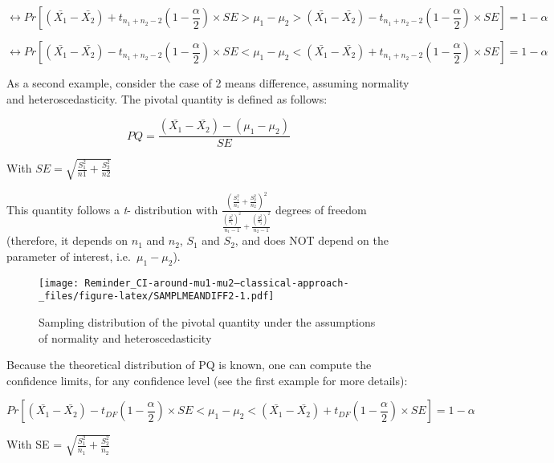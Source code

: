 \documentclass[
  man,floatsintext]{apa6}
\begin{document}
\begin{equation} 
\leftrightarrow Pr[(\bar{X_1}-\bar{X_2}) +t_{n_1+n_2-2}(1-\frac{\alpha}{2}) \times SE > \mu_1-\mu_2 > (\bar{X_1}-\bar{X_2}) - t_{n_1+n_2-2}(1-\frac{\alpha}{2}) \times SE]= 1- \alpha
\label{eq:conflev5}
\end{equation}

\begin{equation} 
\leftrightarrow Pr[(\bar{X_1}-\bar{X_2}) - t_{n_1+n_2-2}(1-\frac{\alpha}{2}) \times SE < \mu_1-\mu_2 <(\bar{X_1}-\bar{X_2}) +t_{n_1+n_2-2}(1-\frac{\alpha}{2}) \times SE]= 1- \alpha
\label{eq:conflev6}
\end{equation}

As a second example, consider the case of 2 means difference, assuming normality and heteroscedasticity. The pivotal quantity is defined as follows:

\begin{equation} 
PQ= \frac{(\bar{X_1}-\bar{X_2})-(\mu_1-\mu_2)}{SE}
\label{eq:PQwelch}
\end{equation}

With \(SE = \sqrt{\frac{S^2_1}{n1}+\frac{S^2_2}{n2}}\)

This quantity follows a \emph{t}- distribution with \(\frac{(\frac{S^2_1}{n_1}+\frac{S^2_2}{n_2})^2}{\frac{(\frac{S^2_1}{n_1})^2}{n_1-1}+\frac{(\frac{S^2_2}{n_2})^2}{n_2-1}}\) degrees of freedom (therefore, it depends on \(n_1\) and \(n_2\), \(S_1\) and \(S_2\), and does NOT depend on the parameter of interest, i.e.~\(\mu_1-\mu_2\)).

\begin{figure}
\centering
\texttt{[image: Reminder\_CI-around-mu1-mu2--classical-approach-\_files/figure-latex/SAMPLMEANDIFF2-1.pdf]}
\caption{\label{fig:SAMPLMEANDIFF2}Sampling distribution of the pivotal quantity under the assumptions of normality and heteroscedasticity}
\end{figure}

Because the theoretical distribution of PQ is known, one can compute the confidence limits, for any confidence level (see the first example for more details):

\begin{equation} 
Pr[(\bar{X_1}-\bar{X_2}) - t_{DF}(1-\frac{\alpha}{2}) \times SE < \mu_1-\mu_2 <(\bar{X_1}-\bar{X_2}) +t_{DF}(1-\frac{\alpha}{2}) \times SE]= 1- \alpha
\label{eq:conflev6}
\end{equation}

With SE = \(\sqrt{\frac{S_1^2}{n_1}+\frac{S_2^2}{n_2}}\)
\end{document}
